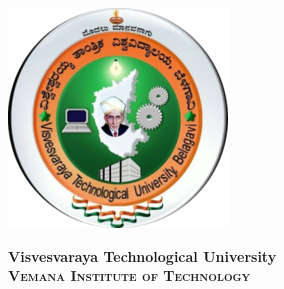 \documentclass[a4paper,12pt]{article}
\begin{document}
\begin{minipage}{0.2\textwidth}
    \includegraphics[width=\textwidth]{vtulogo.png} %
\end{minipage}
\begin{minipage}{0.5\textwidth}
    \centering
    \textbf{\Large Visvesvaraya Technological University} \\
    \vspace{0.2cm}
    \textbf{\textsc{\large Vemana Institute of Technology}} \\
    \vspace{0.2cm}
\end{minipage}
\end{document}
